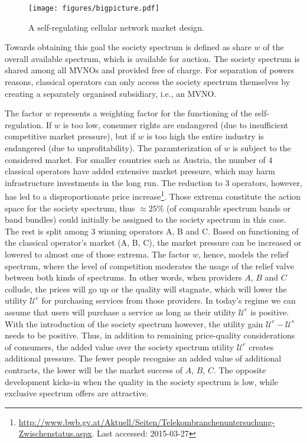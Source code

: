 \documentclass[conference]{IEEEtran}
\begin{document}
\begin{figure}[htbp]
\centering
\texttt{[image: figures/bigpicture.pdf]}
\caption{A self-regulating cellular network market design.}
\label{fig:big_picture}
\end{figure}

	Towards obtaining this goal the society spectrum is defined as share $w$ of the overall available spectrum, which is available for auction. The society spectrum is shared among all MVNOs   and provided free of charge. For separation of powers reasons, classical operators can only access the society spectrum themselves by creating a separately organised subsidiary, i.e., an MVNO. 
	
	The factor $w$ represents a weighting factor for the functioning of the self-regulation. If $w$ is too low, consumer rights are endangered (due to insufficient competitive market pressure), but if $w$ is too high the entire industry is endangered (due to unprofitability). The paramterization of $w$ is subject to the considered market. For smaller countries such as Austria, the number of $4$ classical operators have added extensive market pressure, which may harm infrastructure investments in the long run. The reduction to $3$ operators, however, has led to a disproportionate price increase\footnote{\url{http://www.bwb.gv.at/Aktuell/Seiten/Telekombranchenuntersuchung-Zwischenstatus.aspx}. Last accessed: 2015-03-27}. Those extrema constitute the action space for the society spectrum, thus $\approx 25\%$ (of comparable spectrum bands or band bundles) could initially be assigned to the society spectrum in this case. The rest is split among 3 winning operators A, B and C. Based on functioning of the classical operator's market (A, B, C), the market pressure can be increased or lowered to almost one of those extrema. The factor $w$, hence, models the relief spectrum, where the level of competition moderates the usage of the relief valve between both kinds of spectrums. In other words, when providers $A$, $B$ and $C$ collude, the prices will go up or the quality will stagnate, which will lower the utility $\mathcal{U}^e$ for purchasing services from those providers. In today's regime we can assume that users will purchase a service as long as their utility $\mathcal{U}^e$ is positive. With the introduction of the society spectrum however, the utility gain $\mathcal{U}^e - \mathcal{U}^s$ needs to be positive. Thus, in addition to remaining price-quality considerations of consumers, the added value over the society spectrum utility $\mathcal{U}^e$ creates additional pressure. The fewer people recognise an added value of additional contracts, the lower will be the market success of $A$, $B$, $C$. The opposite development kicks-in when the quality in the society spectrum is low, while exclusive spectrum offers are attractive.
	
\end{document}
